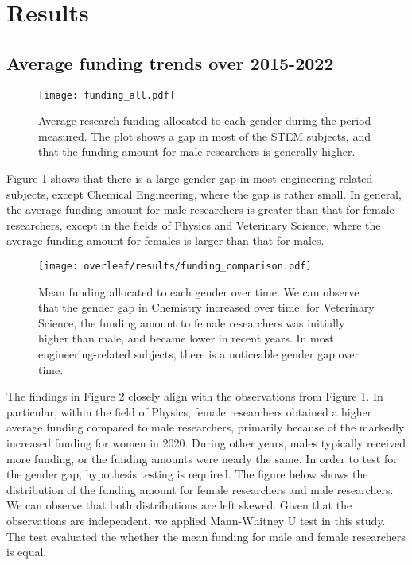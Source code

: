 \section{Results}

\subsection{Average funding trends over 2015-2022}

\begin{figure}
    \centering
    \texttt{[image: funding\_all.pdf]}
    \caption{Average research funding allocated to each gender during the period measured. The plot shows a gap in most of the STEM subjects, and that the funding amount for male researchers is generally higher.}
\end{figure}
Figure 1 shows that there is a large gender gap in most engineering-related subjects, except Chemical Engineering, where the gap is rather small. In general, the average funding amount for male researchers is greater than that for female researchers, except in the fields of Physics and Veterinary Science, where the average funding amount for females is larger than that for males.
\begin{figure}
    \centering
    \texttt{[image: overleaf/results/funding\_comparison.pdf]}
    \caption{Mean funding allocated to each gender over time. We can observe that the gender gap in Chemistry increased over time; for Veterinary Science, the funding amount to female researchers was initially higher than male, and became lower in recent years. In most engineering-related subjects, there is a noticeable gender gap over time.}
\end{figure}
The findings in Figure 2 closely align with the observations from Figure 1. In particular, within the field of Physics, female researchers obtained a higher average funding compared to male researchers, primarily because of the markedly increased funding for women in 2020. During other years, males typically received more funding, or the funding amounts were nearly the same.
In order to test for the gender gap, hypothesis testing is required. The figure below shows the distribution of the funding amount for female researchers and male researchers. We can observe that both distributions are left skewed. Given that the observations are independent, we applied Mann-Whitney U test in this study. The test evaluated the whether the mean funding for male and female researchers is equal.

